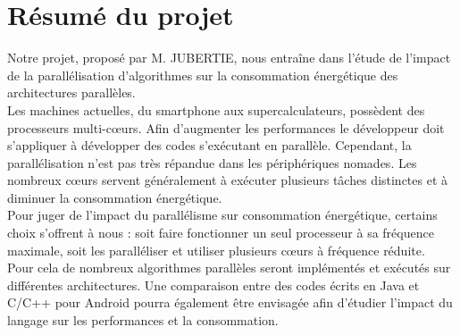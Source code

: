 \chapter{Résumé du projet}

Notre projet, proposé par M. JUBERTIE, nous entraîne dans l'étude de l'impact de la parallélisation d'algorithmes sur la consommation énergétique des architectures parallèles.\\ 

Les machines actuelles, du smartphone aux supercalculateurs, possèdent des 
processeurs multi-c\oe{}urs. Afin d'augmenter les performances le développeur doit s'appliquer à développer des codes s'exécutant en parallèle. Cependant, la parallélisation n'est pas très répandue dans les périphériques nomades. Les nombreux c\oe{}urs servent généralement à exécuter plusieurs tâches distinctes et à diminuer la consommation 
énergétique. \\

Pour juger de l'impact du parallélisme sur consommation énergétique, certains choix s'offrent à nous  : soit faire fonctionner un seul processeur à sa fréquence 
maximale, soit les paralléliser et utiliser plusieurs c\oe{}urs à fréquence réduite. \\

Pour cela de nombreux algorithmes parallèles seront implémentés et exécutés sur différentes architectures.
Une comparaison entre des codes écrits en Java et C/C++ pour Android pourra 
également être envisagée afin d'étudier l'impact du langage sur les 
performances et la consommation. \\ 
